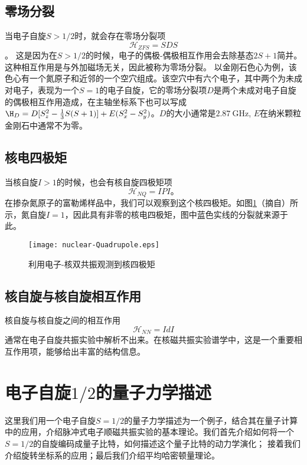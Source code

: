     \subsection{零场分裂}
    当电子自旋$S>1/2$时，就会存在零场分裂项
        \begin{equation}
        \label{zero-field-splitting}
        \mathcal{H}_{ZFS} = S D S
        \end{equation}。
    这是因为在$S>1/2$的时候，电子的偶极-偶极相互作用会去除基态$2S+1$简并。这种相互作用是与外加磁场无关，因此被称为零场分裂。
    以金刚石色心为例，该色心有一个氮原子和近邻的一个空穴组成。该空穴中有六个电子，其中两个为未成对电子，表现为一个$S=1$的电子自旋，它的零场分裂项$D$是两个未成对电子自旋的偶极相互作用造成，在主轴坐标系下也可以写成
    $\H_D = D[S_z^2-\frac{1}{3}S(S+1)]+E(S_x^2-S_y^2)$。$D$的大小通常是$2.87~$GHz, $E$在纳米颗粒金刚石中通常不为零。

    \subsection{核电四极矩}
    当核自旋$I>1$的时候，也会有核自旋四极矩项
        \begin{equation}
        \label{NQ}
        \mathcal{H}_{NQ} = I P I。
        \end{equation}
    在掺杂氮原子的富勒烯样品中，我们可以观察到这个核四极矩\cite{Revisited-endor}。如图\ref{nuclear-Quadrupole}（摘自\cite{Revisited-endor}）所示，氮自旋$I=1$，因此具有非零的核电四极矩，图中蓝色实线的分裂就来源于此。
        \begin{figure}[htbp]
            \begin{center}
              \texttt{[image: nuclear-Quadrupole.eps]}
              \caption{利用电子-核双共振观测到核四极矩
              }
              \label{nuclear-Quadrupole}
            \end{center}
        \end{figure}

    \subsection{核自旋与核自旋相互作用}
    核自旋与核自旋之间的相互作用
        \begin{equation}
        \mathcal{H}_{NN} = I d I
        \end{equation}
    通常在电子自旋共振实验中解析不出来。在核磁共振实验谱学中，这是一个重要相互作用项，能够给出丰富的结构信息。

    \section{电子自旋$1/2$的量子力学描述}
    这里我们用一个电子自旋$S=1/2$的量子力学描述为一个例子，结合其在量子计算中的应用，介绍脉冲式电子顺磁共振实验的基本理论。我们首先介绍如何将一个$S=1/2$的自旋编码成量子比特，如何描述这个量子比特的动力学演化；
    接着我们介绍旋转坐标系的应用；最后我们介绍平均哈密顿量理论。

